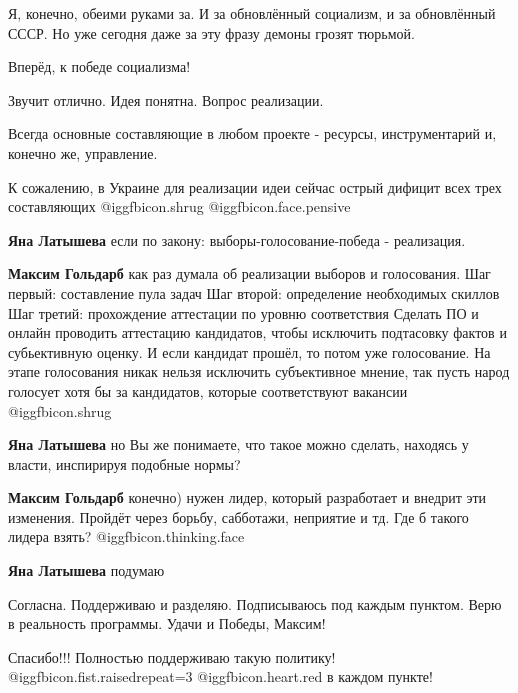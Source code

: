 \begin{itemize}
\begin{itemize}

Я, конечно, обеими руками за. И за обновлённый социализм, и за обновлённый
СССР. Но уже сегодня даже за эту фразу демоны грозят тюрьмой.

\end{itemize} %

Вперёд, к победе социализма!


Звучит отлично. Идея понятна. Вопрос реализации.

Всегда основные составляющие в любом проекте - ресурсы, инструментарий и,
конечно же, управление.

К сожалению, в Украине для реализации идеи сейчас острый дифицит всех трех
составляющих  @igg{fbicon.shrug}  @igg{fbicon.face.pensive} 

\begin{itemize} %
\textbf{Яна Латышева} если по закону: выборы-голосование-победа - реализация.

\textbf{Максим Гольдарб} как раз думала об реализации выборов и голосования.
Шаг первый: составление пула задач
Шаг второй: определение необходимых скиллов
Шаг третий: прохождение аттестации по уровню соответствия
Сделать ПО и онлайн проводить аттестацию кандидатов, чтобы исключить подтасовку фактов и субьективную оценку.
И если кандидат прошёл, то потом уже голосование.
На этапе голосования никак нельзя исключить субъективное мнение, так пусть народ голосует хотя бы за кандидатов, которые соответствуют вакансии @igg{fbicon.shrug} 

\textbf{Яна Латышева} но Вы же понимаете, что такое можно сделать, находясь у власти, инспирируя подобные нормы?

\textbf{Максим Гольдарб} конечно) нужен лидер, который разработает и внедрит эти изменения. Пройдёт через борьбу, сабботажи, неприятие и тд. Где б такого лидера взять?  @igg{fbicon.thinking.face} 

\textbf{Яна Латышева} подумаю
\end{itemize} %


Согласна. Поддерживаю и разделяю. Подписываюсь под каждым пунктом. Верю в
реальность программы. Удачи и Победы, Максим!

Спасибо!!! Полностью поддерживаю такую политику!
@igg{fbicon.fist.raised}{repeat=3} @igg{fbicon.heart.red} в каждом пункте!


\end{itemize}
